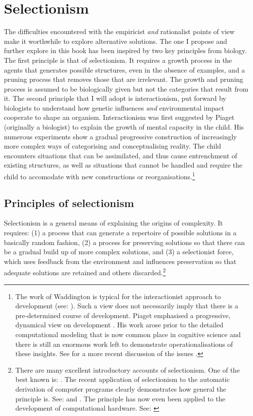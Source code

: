 \section{Selectionism}

The difficulties encountered with the empiricist
{\it and} rationalist points of view make it worthwhile
to explore alternative solutions. The one I propose
and further explore in this book 
has been inspired by two key principles 
from biology. The first principle is
that of selectionism. It requires 
a growth process in the agents that generates possible 
structures, even in the absence of examples, and a pruning
process that removes those
that are irrelevant. The growth and pruning
process is assumed to be biologically given
but not the categories that result from it.  
The second principle that 
I will adopt is interactionism, put forward by biologists 
to understand how genetic influences {\it and} environmental 
impact cooperate to shape an organism. Interactionism 
was first suggested by Piaget (originally a biologist)
to explain the growth of mental capacity in the child. 
His numerous experiments show a gradual progressive construction of 
increasingly more complex ways of categorising and 
conceptualising reality. The child encounters situations that 
can be assimilated, and thus cause entrenchment of
existing structures, as well 
as situations that cannot be handled and require 
the child to accomodate with new 
constructions or reorganisations.\footnote{
The work of Waddington is typical for the 
interactionist approach to development (see: \cite{Waddington:1975}). 
Such a view does not necessarily imply that there is 
a pre-determined course of development.
Piaget emphasised a progressive, dynamical view on 
development \cite{Piaget:1985}. 
His work arose prior to the detailed
computational modeling that is now common place in 
cognitive science and there is still an enormous 
work left to demonstrate operationalisations of these
insights. See for a more recent discussion of 
the issues \cite{Thelen:1994}.}

\subsection{Principles of selectionism}

Selectionism is a general means of explaining the origins of 
complexity. It requires: (1) a process that 
can generate a repertoire of possible solutions in a 
basically random fashion, (2) a process for preserving 
solutions so that there can be a gradual build up of 
more complex solutions, and (3) a 
selectionist force, which uses
feedback from the environment and influences preservation
so that adequate solutions are retained 
and others discarded.\footnote{
There are many excellent introductory 
accounts of selectionism. One of the best
known is: \cite{Dawkins:1995}. The 
recent application of selectionism to the automatic
derivation of computer programs clearly demonstrates
how general the principle is. See: \cite{Goldberg:1989} and \cite{Koza:1997}. 
The principle has now even been applied to 
the development of computational hardware. See: \cite{Sipper:1998}}

